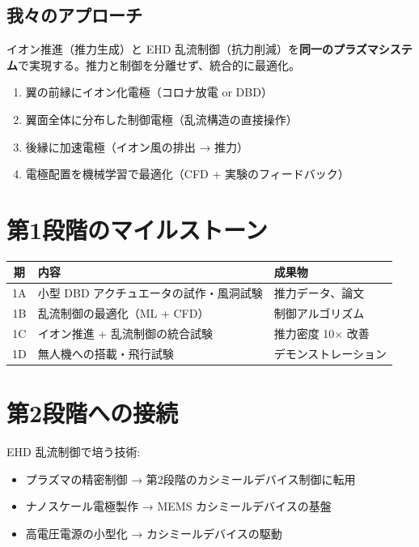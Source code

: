 \documentclass[11pt,a4paper]{article}
\begin{document}
\subsection{我々のアプローチ}

イオン推進（推力生成）と EHD 乱流制御（抗力削減）を\textbf{同一のプラズマシステム}で実現する。推力と制御を分離せず、統合的に最適化。

\begin{techbox}[設計コンセプト]
\begin{enumerate}
\item 翼の前縁にイオン化電極（コロナ放電 or DBD）
\item 翼面全体に分布した制御電極（乱流構造の直接操作）
\item 後縁に加速電極（イオン風の排出 → 推力）
\item 電極配置を機械学習で最適化（CFD + 実験のフィードバック）
\end{enumerate}
\end{techbox}

\section{第1段階のマイルストーン}

\begin{center}
\renewcommand{\arraystretch}{1.3}
\begin{tabular}{cll}
\toprule
期 & 内容 & 成果物 \\
\midrule
1A & 小型 DBD アクチュエータの試作・風洞試験 & 推力データ、論文 \\
1B & 乱流制御の最適化（ML + CFD） & 制御アルゴリズム \\
1C & イオン推進 + 乱流制御の統合試験 & 推力密度 10× 改善 \\
1D & 無人機への搭載・飛行試験 & デモンストレーション \\
\bottomrule
\end{tabular}
\end{center}

\section{第2段階への接続}

EHD 乱流制御で培う技術:
\begin{itemize}
\item プラズマの精密制御 → 第2段階のカシミールデバイス制御に転用
\item ナノスケール電極製作 → MEMS カシミールデバイスの基盤
\item 高電圧電源の小型化 → カシミールデバイスの駆動
\end{itemize}
\end{document}

